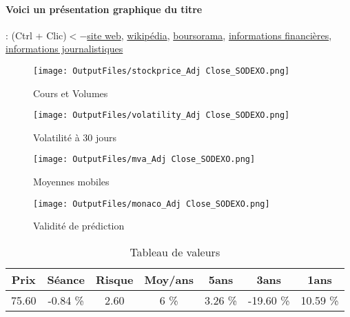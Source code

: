 \documentclass[11pt,a4paper]{report}%
\begin{document}
\paragraph{Voici un présentation graphique du titre} : (Ctrl + Clic)$<-$\href{https://www.sodexo.com/fr/home/finance.html}{site web}, \href{https://fr.wikipedia.org/wiki/Sodexo}{wikipédia}, \href{https://www.boursorama.com/cours/1rPSW}{boursorama}, \href{https://www.qwant.com/?q=site:https:%2f%2fwww.easybourse.com%2faction-societe%2fSODEXO&t=web&client=ext-firefox-hp}{informations financières}, \href{https://bourse.lerevenu.com/cours-de-bourse/fiche-valeur-synthese/SODEXO/SW-FR}{informations journalistiques}
\begin{figure}[!htb]
   \begin{minipage}{0.5\textwidth}
     \centering
     \texttt{[image: OutputFiles/stockprice\_Adj Close\_SODEXO.png]}
     \caption{Cours et Volumes}\label{Fig:price_SODEXO}
   \end{minipage}\hfill
   \begin{minipage}{0.5\textwidth}
     \centering
     \texttt{[image: OutputFiles/volatility\_Adj Close\_SODEXO.png]}
     \caption{Volatilité à 30 jours}\label{Fig:volat_SODEXO}
   \end{minipage}
\end{figure}
\begin{figure}[!htb]
   \begin{minipage}{0.5\textwidth}
     \centering
     \texttt{[image: OutputFiles/mva\_Adj Close\_SODEXO.png]}
     \caption{Moyennes mobiles}\label{Fig:mva_SODEXO}
   \end{minipage}\hfill
   \begin{minipage}{0.5\textwidth}
     \centering
     \texttt{[image: OutputFiles/monaco\_Adj Close\_SODEXO.png]}
     \caption{Validité de prédiction}\label{Fig:prediction_SODEXO}
   \end{minipage}
\end{figure}

\begin{table}[H]
  \centering
    \begin{tabular}{|c|c|c|c|c|c|c|}
    \hline
    Prix & Séance & Risque  & Moy/ans & 5ans & 3ans & 1ans \\
    \hline
    75.60 &    -0.84 \%    & 2.60 & 6 \% & 3.26 \% & -19.60 \% & 10.59 \% \\
    \hline
    \end{tabular}%
        \label{tab:table_SODEXO}%
      \caption{Tableau de valeurs}
\end{table}%
\end{document}
